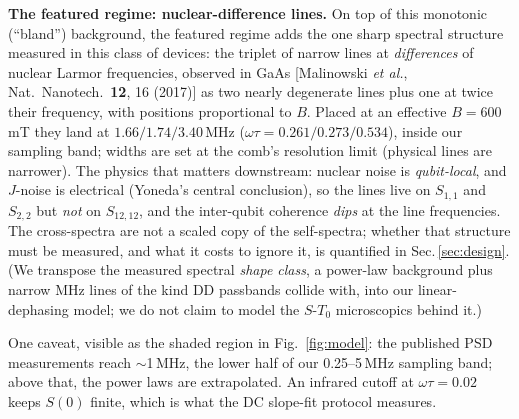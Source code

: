 \documentclass[10pt]{article}
\begin{document}
\textbf{The featured regime: nuclear-difference lines.} On top of this
monotonic (``bland'') background, the featured regime adds the one sharp
spectral structure measured in this class of devices: the triplet of narrow
lines at \emph{differences} of nuclear Larmor frequencies, observed in GaAs
[Malinowski \emph{et al.}, Nat.\ Nanotech.\ \textbf{12}, 16 (2017)] as two
nearly degenerate lines plus one at twice their frequency, with positions
proportional to $B$. Placed at an effective $B = 600$\,mT they land at
$1.66/1.74/3.40$\,MHz ($\omega\tau = 0.261/0.273/0.534$), inside our
sampling band; widths are set at the comb's resolution limit (physical lines
are narrower). The physics that matters downstream: nuclear noise is
\emph{qubit-local}, and $J$-noise is electrical (Yoneda's central
conclusion), so the lines live on $S_{1,1}$ and $S_{2,2}$ but \emph{not} on
$S_{12,12}$, and the inter-qubit coherence \emph{dips} at the line
frequencies. The cross-spectra are not a scaled copy of the self-spectra;
whether that structure must be measured, and what it costs to ignore it, is
quantified in Sec.\,\ref{sec:design}. (We transpose the measured spectral
\emph{shape class}, a power-law background plus narrow MHz lines of the kind
DD passbands collide with, into our linear-dephasing model; we do not claim
to model the $S$-$T_0$ microscopics behind it.)

One caveat, visible as the shaded region in Fig.~\ref{fig:model}: the
published PSD measurements reach $\sim$1\,MHz, the lower half of our
0.25--5\,MHz sampling band; above that, the power laws are extrapolated. An
infrared cutoff at $\omega\tau = 0.02$ keeps $S(0)$ finite, which is what the
DC slope-fit protocol measures.
\end{document}
